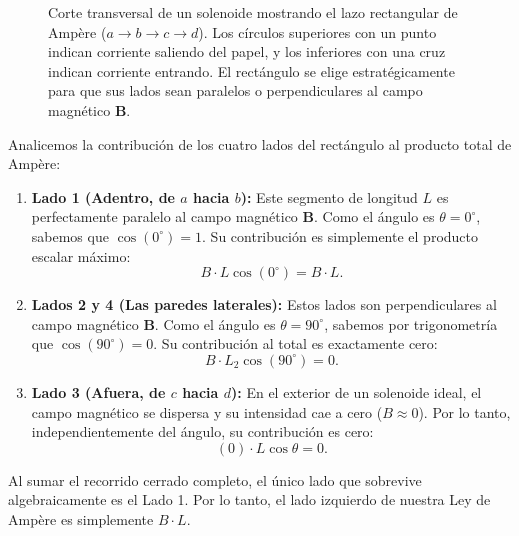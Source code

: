 \documentclass[11pt,a4paper]{book}
\begin{document}
\begin{figure}[htbp]
\caption{Corte transversal de un solenoide mostrando el lazo rectangular de Ampère ($a \rightarrow b \rightarrow c \rightarrow d$). Los círculos superiores con un punto indican corriente saliendo del papel, y los inferiores con una cruz indican corriente entrando. El rectángulo se elige estratégicamente para que sus lados sean paralelos o perpendiculares al campo magnético $\boldsymbol{B}$.}
\label{fig:ampere_solenoide}
\end{figure}

Analicemos la contribución de los cuatro lados del rectángulo al producto total de Ampère:

\begin{enumerate}
    \item \textbf{Lado 1 (Adentro, de $a$ hacia $b$):} Este segmento de longitud $L$ es perfectamente paralelo al campo magnético $\boldsymbol{B}$. Como el ángulo es $\theta = 0^\circ$, sabemos que $\cos(0^\circ) = 1$. Su contribución es simplemente el producto escalar máximo:
    \begin{equation}
        B \cdot L \cos(0^\circ) = B \cdot L.
    \end{equation}
    
    \item \textbf{Lados 2 y 4 (Las paredes laterales):} Estos lados son perpendiculares al campo magnético $\boldsymbol{B}$. Como el ángulo es $\theta = 90^\circ$, sabemos por trigonometría que $\cos(90^\circ) = 0$. Su contribución al total es exactamente cero:
    \begin{equation}
        B \cdot L_2 \cos(90^\circ) = 0.
    \end{equation}
    
    \item \textbf{Lado 3 (Afuera, de $c$ hacia $d$):} En el exterior de un solenoide ideal, el campo magnético se dispersa y su intensidad cae a cero ($B \approx 0$). Por lo tanto, independientemente del ángulo, su contribución es cero:
    \begin{equation}
        (0) \cdot L \cos\theta = 0.
    \end{equation}
\end{enumerate}

Al sumar el recorrido cerrado completo, el único lado que sobrevive algebraicamente es el Lado 1. Por lo tanto, el lado izquierdo de nuestra Ley de Ampère es simplemente $B \cdot L$.
\end{document}
